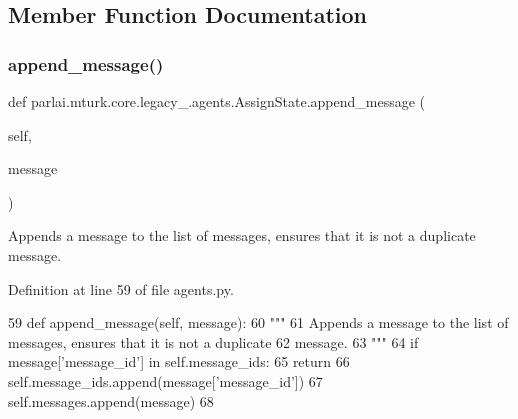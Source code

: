 \subsection{Member Function Documentation}
\mbox{\label{classparlai_1_1mturk_1_1core_1_1legacy__2018_1_1agents_1_1AssignState_af36e4b00767bbb4459ce87fe95b17672}} 
\subsubsection{\texorpdfstring{append\+\_\+message()}{append\_message()}}
{\footnotesize\ttfamily def parlai.\+mturk.\+core.\+legacy\+\_.\+agents.\+Assign\+State.\+append\+\_\+message (\begin{DoxyParamCaption}\item[{}]{self,  }\item[{}]{message }\end{DoxyParamCaption})}

\begin{DoxyVerb}Appends a message to the list of messages, ensures that it is not a duplicate
message.
\end{DoxyVerb}
 

Definition at line 59 of file agents.\+py.


\begin{DoxyCode}
59     \textcolor{keyword}{def }append\_message(self, message):
60         \textcolor{stringliteral}{"""}
61 \textcolor{stringliteral}{        Appends a message to the list of messages, ensures that it is not a duplicate}
62 \textcolor{stringliteral}{        message.}
63 \textcolor{stringliteral}{        """}
64         \textcolor{keywordflow}{if} message[\textcolor{stringliteral}{'message\_id'}] \textcolor{keywordflow}{in} self.message\_ids:
65             \textcolor{keywordflow}{return}
66         self.message\_ids.append(message[\textcolor{stringliteral}{'message\_id'}])
67         self.messages.append(message)
68 
\end{DoxyCode}
\mbox{\label{classparlai_1_1mturk_1_1core_1_1legacy__2018_1_1agents_1_1AssignState_aef53107e3d4aa840b7fcca32ef393bf3}} 
